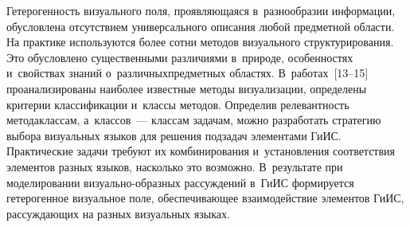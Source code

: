 \begin{multicols}{2}
  Гетерогенность визуального поля, проявляющаяся в~разнообразии 
информации, обусловлена отсутствием универсального описания любой 
предметной области. На практике используются более сотни методов 
визуального структурирования. Это обусловлено существенными различиями 
в~природе, особенностях и~свойствах знаний о~различных\linebreak предметных 
областях. В~работах~[13--15] проанализированы наиболее 
известные методы визуализации, определены критерии классификации 
и~классы методов. Определив релевантность метода\linebreak классам, а~классов~--- 
классам задачам, можно разработать стратегию выбора визуальных языков для 
решения подзадач элементами ГиИС. Практические задачи требуют их 
комбинирования и~установления соответствия элементов разных языков, 
насколько это возможно. В~результате при моделировании  
ви\-зу\-аль\-но-об\-раз\-ных рассуждений в~ГиИС формируется гетерогенное 
визуальное поле, обеспечивающее взаимодействие элементов ГиИС, 
рассуждающих на разных визуальных языках.
  

\end{multicols}
